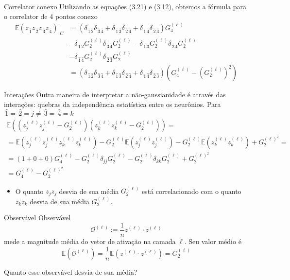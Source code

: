 \documentclass{beamer}
\newcommand{\EE}{\mathbb{E}}
\newcommand{\OO}{\mathcal{O}}
\def\mi#1{{\,\widehat{#1}}}
\def\eell{{(\ell)}}
\def\wickquatro{\delta_{\mi1\mi2}\delta_{\mi3\mi4} + \delta_{\mi1\mi3}\delta_{\mi2\mi4}+  \delta_{\mi1\mi4}\delta_{\mi2\mi3}}
\begin{document}
\begin{frame}{Correlator conexo}
	Utilizando as equações (3.21) e (3.12), obtemos a fórmula para o correlator de 4 pontos conexo
	\small
	\begin{align*}\tag{3.29}
	\left.\EE(z_{\mi1} z_{\mi2} z_{\mi3} z_{\mi4})\right|_C &=  \left(\wickquatro \right)G_4^\eell  \\
	 &- \delta_{\mi1\mi2}G_2^\eell  \delta_{\mi3\mi4}G_2^\eell  - \delta_{\mi1\mi3}G_2^\eell\delta_{\mi2\mi4}  G_2^\eell  \\
	 &- \delta_{\mi1\mi4}G_2^\eell\delta_{\mi2\mi3}  G_2^\eell  \\
	 &=  \left(\wickquatro \right)\left(G_4^\eell - \left(G_2^\eell\right)^2\right)
	\end{align*}
\end{frame}

\begin{frame}{Interações}
	Outra maneira de interpretar a não-gaussianidade é através das interações: quebras da independência estatística entre os neurônios.
	Para $\mi1=\mi2=j \neq \mi3=\mi4=k$ {\small
	\begin{multline*}\tag{3.30}
		\EE\left( \left(z_j^\eell z_j^\eell - G_2^\eell\right)  \left(z_k^\eell z_k^\eell - G_2^\eell\right) \right) = \\
		= \EE\left(z_j^\eell z_j^\eell z_k^\eell z_k^\eell\right) - G^\eell_2\EE\left(z_j^\eell z_j^\eell\right) - G^\eell_2\EE\left(z_k^\eell z_k^\eell\right)  + G_2^{\eell^2} = \\
		= (1+0+0)G_4^\eell - G_2^\eell \delta_{jj}G_2^\eell - G_2^\eell \delta_{kk}G_2^\eell + G_2^{\eell^2} \\
		= G_4^\eell - G_2^{\eell^2} 
	\end{multline*}
	}
	\begin{itemize}
		\item O quanto $z_jz_j$ desvia de sua média $G_2^\eell$ está correlacionado com o quanto $z_kz_k$ desvia de sua média $G_2^\eell$.
	\end{itemize}
\end{frame}

\begin{frame}{Observável}
	Observável
	\begin{equation*}
		\OO^\eell := \frac{1}{n}z^\eell\cdot z^\eell
	\end{equation*}
mede a magnitude média do vetor de ativação na camada $\ell$. Seu valor médio é
	\begin{equation*}
		\EE\left(\OO^\eell\right) = \frac{1}{n}\EE\left(z^\eell\cdot z^\eell\right) = G_2^\eell
	\end{equation*}

Quanto esse observável desvia de sua média?
\end{frame}
\end{document}

